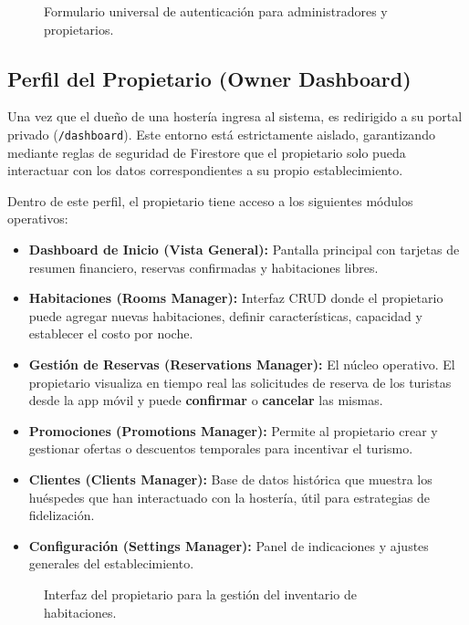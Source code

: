 \documentclass[12pt,letterpaper]{report}
\begin{document}
\begin{figure}[H]
  \centering
  \caption{Formulario universal de autenticación para administradores y propietarios.}
\end{figure}

\subsection{Perfil del Propietario (Owner Dashboard)}
Una vez que el dueño de una hostería ingresa al sistema, es redirigido a su portal privado (\texttt{/dashboard}). Este entorno está estrictamente aislado, garantizando mediante reglas de seguridad de Firestore que el propietario solo pueda interactuar con los datos correspondientes a su propio establecimiento.

Dentro de este perfil, el propietario tiene acceso a los siguientes módulos operativos:
\begin{itemize}
  \item \textbf{Dashboard de Inicio (Vista General):} Pantalla principal con tarjetas de resumen financiero, reservas confirmadas y habitaciones libres.
  \item \textbf{Habitaciones (Rooms Manager):} Interfaz CRUD donde el propietario puede agregar nuevas habitaciones, definir características, capacidad y establecer el costo por noche.
  \item \textbf{Gestión de Reservas (Reservations Manager):} El núcleo operativo. El propietario visualiza en tiempo real las solicitudes de reserva de los turistas desde la app móvil y puede \textbf{confirmar} o \textbf{cancelar} las mismas.
  \item \textbf{Promociones (Promotions Manager):} Permite al propietario crear y gestionar ofertas o descuentos temporales para incentivar el turismo.
  \item \textbf{Clientes (Clients Manager):} Base de datos histórica que muestra los huéspedes que han interactuado con la hostería, útil para estrategias de fidelización.
  \item \textbf{Configuración (Settings Manager):} Panel de indicaciones y ajustes generales del establecimiento.
\end{itemize}

\begin{figure}[H]
  \centering
  \caption{Interfaz del propietario para la gestión del inventario de habitaciones.}
\end{figure}
\end{document}
